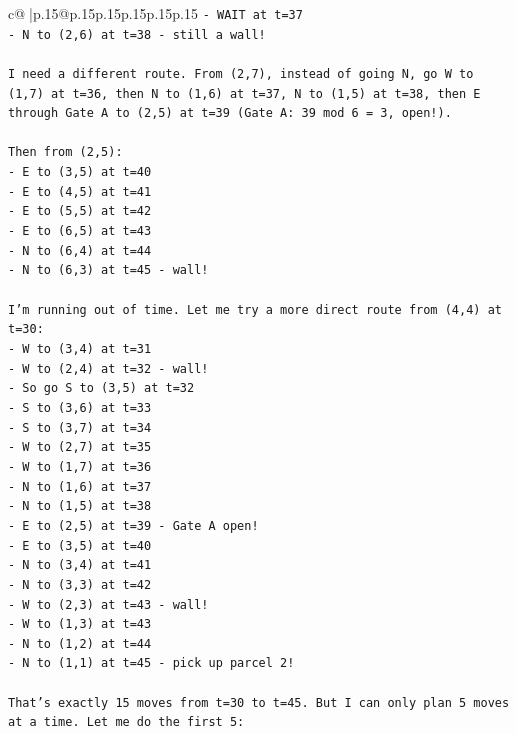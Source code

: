 \documentclass{article}
\begin{document}
{\begin{supertabular}{c@{$\;$}|p{.15\linewidth}@{}p{.15\linewidth}p{.15\linewidth}p{.15\linewidth}p{.15\linewidth}p{.15\linewidth}}
{{{\texttt{{-} WAIT at t=37} \\
\texttt{{-} N to (2,6) at t=38 {-} still a wall!} \\
\\ 
\texttt{I need a different route. From (2,7), instead of going N, go W to (1,7) at t=36, then N to (1,6) at t=37, N to (1,5) at t=38, then E through Gate A to (2,5) at t=39 (Gate A: 39 mod 6 = 3, open!).} \\
\\ 
\texttt{Then from (2,5):} \\
\texttt{{-} E to (3,5) at t=40} \\
\texttt{{-} E to (4,5) at t=41} \\
\texttt{{-} E to (5,5) at t=42} \\
\texttt{{-} E to (6,5) at t=43} \\
\texttt{{-} N to (6,4) at t=44} \\
\texttt{{-} N to (6,3) at t=45 {-} wall!} \\
\\ 
\texttt{I'm running out of time. Let me try a more direct route from (4,4) at t=30:} \\
\texttt{{-} W to (3,4) at t=31} \\
\texttt{{-} W to (2,4) at t=32 {-} wall!} \\
\texttt{{-} So go S to (3,5) at t=32} \\
\texttt{{-} S to (3,6) at t=33} \\
\texttt{{-} S to (3,7) at t=34} \\
\texttt{{-} W to (2,7) at t=35} \\
\texttt{{-} W to (1,7) at t=36} \\
\texttt{{-} N to (1,6) at t=37} \\
\texttt{{-} N to (1,5) at t=38} \\
\texttt{{-} E to (2,5) at t=39 {-} Gate A open!} \\
\texttt{{-} E to (3,5) at t=40} \\
\texttt{{-} N to (3,4) at t=41} \\
\texttt{{-} N to (3,3) at t=42} \\
\texttt{{-} W to (2,3) at t=43 {-} wall!} \\
\texttt{{-} W to (1,3) at t=43} \\
\texttt{{-} N to (1,2) at t=44} \\
\texttt{{-} N to (1,1) at t=45 {-} pick up parcel 2!} \\
\\ 
\texttt{That's exactly 15 moves from t=30 to t=45. But I can only plan 5 moves at a time. Let me do the first 5:} \\
}}}
\end{supertabular}}
\end{document}
